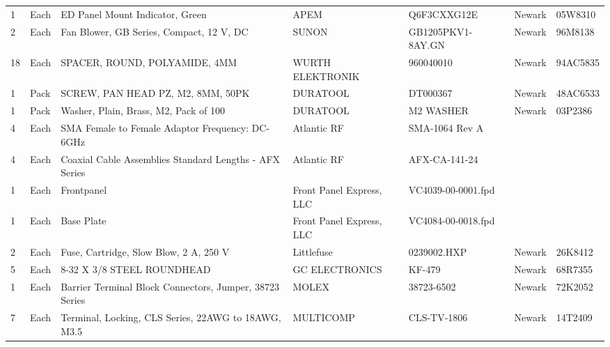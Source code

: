 \documentclass[12pt,a4paper,oneside]{article}
\begin{document}
\begin{table}[H]
{\begin{tabular}{@{}lllllll@{}}
1        & Each & ED Panel Mount Indicator, Green                          			& APEM                     		& Q6F3CXXG12E            	& Newark            	& 05W8310    \\
2        & Each & Fan Blower, GB Series, Compact, 12 V, DC                 		& SUNON                    		& GB1205PKV1-8AY.GN	& Newark            	& 96M8138     \\
18      & Each & SPACER, ROUND, POLYAMIDE, 4MM                           	& WURTH ELEKTRONIK         	& 960040010                  	& Newark            	& 94AC5835    \\
1        & Pack & SCREW, PAN HEAD PZ, M2, 8MM, 50PK                        	& DURATOOL                 		& DT000367                    	& Newark            	& 48AC6533      \\
1        & Pack & Washer, Plain, Brass, M2, Pack of 100                    		& DURATOOL                 		& M2 WASHER        		& Newark            	& 03P2386         \\
4        & Each & SMA Female to Female Adaptor Frequency: DC-6GHz          & Atlantic RF              		& SMA-1064 Rev A         	&                   &                             \\
4        & Each & Coaxial Cable Assemblies Standard Lengths - AFX Series   	& Atlantic RF              		& AFX-CA-141-24            	&                   &                             \\
1        & Each & Frontpanel                                               				& Front Panel Express, LLC 	& VC4039-00-0001.fpd     	&                   &                             \\
1        & Each & Base Plate                                               				& Front Panel Express, LLC 	& VC4084-00-0018.fpd    	&                   &                             \\
2        & Each & Fuse, Cartridge, Slow Blow, 2 A, 250 V                   		& Littlefuse               			& 0239002.HXP              	& Newark            	& 26K8412    \\
5        & Each & 8-32 X 3/8 STEEL ROUNDHEAD                               		& GC ELECTRONICS           	& KF-479                      	& Newark           	& 68R7355   \\
1        & Each & Barrier Terminal Block Connectors, Jumper, 38723 Series  	& MOLEX                    		& 38723-6502                  	& Newark            	& 72K2052    \\
7        & Each & Terminal, Locking, CLS Series, 22AWG to 18AWG, M3.5 	& MULTICOMP                		& CLS-TV-1806                 & Newark            	& 14T2409     \\ \bottomrule            
\end{tabular}}
\end{table}
\end{document}

